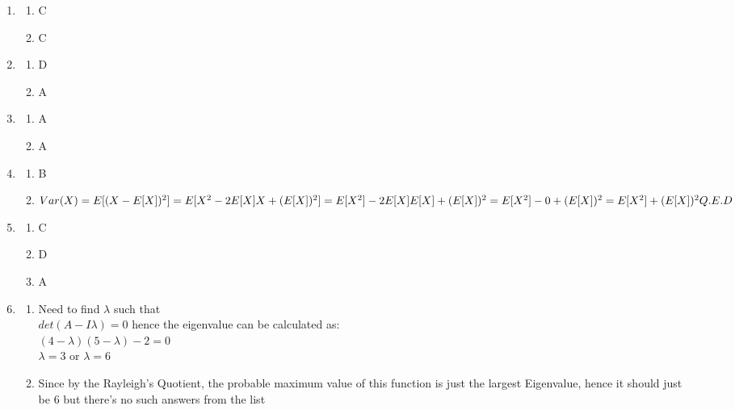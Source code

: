 \documentclass[12pt]{article}
\begin{document}
\begin{enumerate}
\item 
\begin{enumerate}
\item C
\item C
\end{enumerate}

\item
\begin{enumerate}
\item D
\item A
\end{enumerate}

\item
  \begin{enumerate}
  \item A
  \item A
  \end{enumerate}

\item
  \begin{enumerate}
  \item B
  \item 
  $Var(X)
  \\= E[(X - E[X])^2] 
  \\= E[X^2 - 2E[X]X + (E[X])^2] 
  \\= E[X^2] - 2E[X]E[X] + (E[X])^2
  \\= E[X^2] - 0 + (E[X])^2
  \\= E[X^2]  + (E[X])^2
  \\ Q.E.D
  $
  \end{enumerate}
 \item
 \begin{enumerate}
     \item C
     \item D
     \item A
 \end{enumerate}

\item 
\begin{enumerate}
\item
    Need to find $\lambda$ such that\\
    $det(A - I\lambda) = 0$
    hence the eigenvalue can be calculated as:\\
    $(4 - \lambda)(5 - \lambda)  - 2 = 0$\\
    $\lambda = 3 \text{ or } \lambda = 6$
    
\item
    Since by the Rayleigh's Quotient, the probable maximum value of this function
    is just the largest Eigenvalue, hence it should just be $6$ but there's no such answers 
    from the list
    

\end{enumerate}

\end{enumerate}
\end{document}
